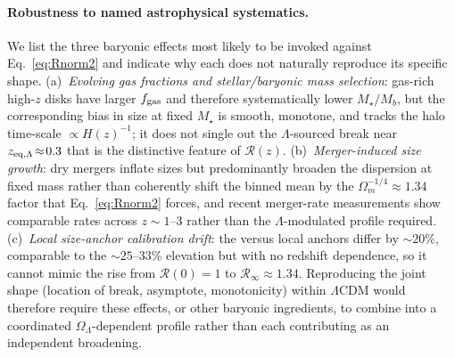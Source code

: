 \documentclass[twocolumn,letterpaper]{aastex631}
\newcommand{\lcdm}{\Lambda\mathrm{CDM}}
\begin{document}
\paragraph{Robustness to named astrophysical systematics.}
We list the three baryonic effects most likely to be invoked
against Eq.~\ref{eq:Rnorm2} and indicate why each does not
naturally reproduce its specific shape.  (a)~\emph{Evolving gas fractions
and stellar/baryonic mass selection}: gas-rich high-$z$ disks
have larger $f_{\rm gas}$ and therefore systematically lower
$M_\star/M_b$, but the corresponding bias in size at fixed
$M_\star$ is smooth, monotone, and tracks the halo time-scale
$\propto H(z)^{-1}$; it does not single out the
$\Lambda$-sourced break near $z_{\rm eq,\Lambda}\!\approx\!0.3$
that is the distinctive feature of $\mathcal{R}(z)$.
(b)~\emph{Merger-induced size growth}: dry mergers inflate sizes
but predominantly broaden the dispersion at fixed mass rather
than coherently shift the binned mean by the
$\Omega_{m}^{-1/4}\!\approx\!1.34$ factor that
Eq.~\ref{eq:Rnorm2} forces, and recent merger-rate measurements
\citep{Conselice2014,Duncan2019} show comparable rates across
$z\!\sim\!1$--$3$ rather than the
$\Lambda$-modulated profile required.
(c)~\emph{Local size-anchor calibration drift}: the
\citet{Shen2003} versus \citet{vanderWel2014} local anchors
differ by $\sim 20\%$, comparable to the $\sim 25$--$33\%$
elevation but with no redshift dependence, so it cannot mimic
the rise from $\mathcal{R}(0)=1$ to
$\mathcal{R}_{\infty}\!\approx\!1.34$.  Reproducing the joint
shape (location of break, asymptote, monotonicity) within
$\lcdm$ would therefore require these effects, or other
baryonic ingredients, to combine into a coordinated
$\Omega_\Lambda$-dependent profile rather than each contributing
as an independent broadening.
\end{document}
